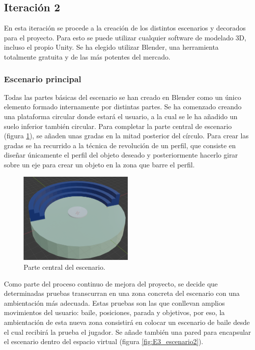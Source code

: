 

\subsection{Iteración 2}

En esta iteración se procede a la creación de los distintos escenarios y decorados para el proyecto. Para esto se puede utilizar cualquier software de modelado 3D, incluso el propio Unity. Se ha elegido utilizar Blender, una herramienta totalmente gratuita y de las más potentes del mercado.


\subsubsection{Escenario principal}

Todas las partes básicas del escenario se han creado en Blender como un único elemento formado internamente por distintas partes. Se ha comenzado creando una plataforma circular donde estará el usuario, a la cual se le ha añadido un suelo inferior también circular. Para completar la parte central de escenario (figura \ref{fig:E3_escenarioCentral}), se añaden unas gradas en la mitad posterior del círculo. Para crear las gradas se ha recurrido a la técnica de revolución de un perfil, que consiste en diseñar únicamente el perfil del objeto deseado y posteriormente hacerlo girar sobre un eje para crear un objeto en la zona que barre el perfil.

\begin{figure}
  \centering
    \includegraphics[width=0.5\textwidth]{04.Desarrollo/03.Entrega3/02.Iteracion3_2/00.Figuras/01.escenario_5.png}
    \caption{Parte central del escenario.}
    \label{fig:E3_escenarioCentral}
\end{figure}

Como parte del proceso continuo de mejora del proyecto, se decide que determinadas pruebas transcurran en una zona concreta del escenario con una ambientación más adecuada. Estas pruebas son las que conllevan amplios movimientos del usuario: baile, posiciones, parada y objetivos, por eso, la ambientación de esta nueva zona consistirá en colocar un escenario de baile desde el cual recibirá la prueba el jugador. Se añade también una pared para encapsular el escenario dentro del espacio virtual (figura \ref{fig:E3_escenario2}).


